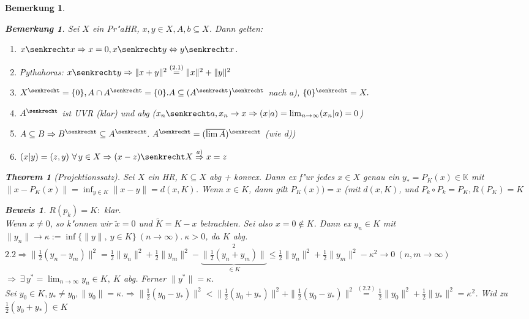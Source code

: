 \documentclass[a4paper,11pt]{book}
\newcommand{\K}{{\mathbb K}}
\newtheorem{Theo}[Def]{Theorem}
\newtheorem{Bem}[Def]{Bemerkung}
\theoremstyle{nonumberplain}
\newtheorem{Bew}{Beweis}
\begin{document}
\begin{Bem}
\begin{Bem}
Sei $X$ ein Pr"aHR, $x,y \in X, A,b \subseteq X$. Dann gelten:
\begin{enumerate}
\item $x \senkrecht x \Rightarrow x = 0, x \senkrecht y \Leftrightarrow y \senkrecht x$.

\item Pythahoras: $x \senkrecht y \Rightarrow \|x+y\|^2 \stackrel{(2.1)}{=} \|x\|^2 + \|y\|^2$

\item $X^\senkrecht = \{0\}, A \cap A^\senkrecht = \{0\}. A \subseteq (A^\senkrecht)^\senkrecht$ nach a), $\{0\}^\senkrecht = X.$

\item $A^\senkrecht$ ist UVR (klar) und abg ($x_n \senkrecht a, x_n \rightarrow x \Rightarrow (x|a) = \lim_{n \rightarrow \infty} (x_n|a) = 0$)

\item $A \subseteq B \Rightarrow B^\senkrecht \subseteq A^\senkrecht.\ A^\senkrecht = (\overline{\lim A})^\senkrecht$ (wie d))

\item $(x|y) = (z,y) \ \forall\, y \in X \Rightarrow (x-z) \senkrecht X \stackrel{a)}{\Rightarrow} x = z$
\end{enumerate}
\end{Bem}

\begin{Theo}[Projektionssatz]
Sei $X$ ein HR, $K \subseteq X$ abg + konvex. Dann ex f"ur jedes $x \in X$ genau ein $y_{\ast} = P_K(x) \in \K$ mit $\| x - P_K(x) \| = \inf_{y \in K} \|x-y\| = d(x,K)$. Wenn $x \in K$, dann gilt $P_K(x) ) = x$ (mit $d(x,K)$, und $P_k \circ P_k = P_K, R(P_K) = K$
\end{Theo}

\begin{Bew}
$R(p_k) = K:$ klar.\\
Wenn $x \not= 0$, so k"onnen wir $\tilde{x} = 0$ und $\tilde{K} = K-x$ betrachten. Sei also $x=0 \not\in K$. Dann ex $y_n \in K$ mit $\|y_n\| \rightarrow \kappa := \inf \{\|y\|,\ y \in K\} \ (n \rightarrow \infty).\ \kappa > 0$, da $K$ abg. $2.2 \Rightarrow \| \frac12 (y_n-y_m)\|^2 = \frac12 \|y_n\|^2 + \frac12 \|y_m\|^2 - \underbrace{\|\frac12(y_n+y_m)\|}_{\in K}^2 \leq \frac12 \|y_n\|^2 + \frac12 \|y_m\|^2 - \kappa^2 \rightarrow 0 \ (n,m \rightarrow \infty)$\\
$\Rightarrow \ \exists\, y^{\ast} = \lim_{n \rightarrow \infty} y_n \in K,\ K$ abg. Ferner $\|y^{\ast}\| = \kappa$.\\
Sei $y_0 \in K, y_{\ast} \not= y_0, \|y_0\| = \kappa. \Rightarrow \|\frac12 (y_0 - y_{\ast})\|^2 < \| \frac12 (y_0 + y_{\ast})\|^2 + \|\frac12 (y_0 - y_{\ast})\|^2 \stackrel{(2.2)}{=} \frac12 \|y_0\|^2 + \frac12 \|y_{\ast}\|^2 = \kappa^2$. Wid zu $\frac12(y_0 + y_{\ast}) \in K$
\end{Bew}



\end{Bem}
\end{document}
